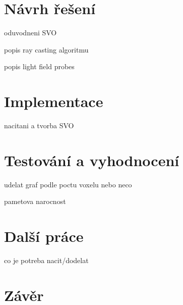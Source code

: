 \chapter{Návrh řešení}
\label{navrh}
oduvodneni SVO

popis ray casting algoritmu

popis light field probes

\chapter{Implementace}
\label{implementace}
nacitani a tvorba SVO


\chapter{Testování a vyhodnocení}
\label{testovani}
udelat graf podle poctu voxelu nebo neco

pametova narocnost

\chapter{Další práce}
\label{dalsi_prace}
co je potreba nacit/dodelat


\chapter{Závěr}
\label{zaver}




